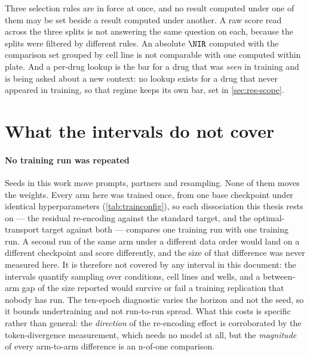%
\begin{scopelimit}
Three selection rules are in force at once, and no result computed under one of
them may be set beside a result computed under another. A raw score read across
the three splits is not answering the same question on each, because the splits
were filtered by different rules. An absolute $\NIR$ computed with the
comparison set grouped by cell line is not comparable with one computed within
plate. And a per-drug lookup is the bar for a drug that was \emph{seen} in
training and is being asked about a new context: no lookup exists for a drug
that never appeared in training, so that regime keeps its own bar, set in
\cref{sec:res-scope}.
\end{scopelimit}

\section{What the intervals do not cover}
\label{sec:lim-intervals}

\paragraph{No training run was repeated} Seeds in this work move prompts,
partners and resampling. None of them moves the weights. Every arm here was
trained once, from one base checkpoint under identical hyperparameters
(\cref{tab:trainconfig}), so each dissociation this thesis rests on --- the
residual re-encoding against the standard target, and the optimal-transport
target against both --- compares one training run with one training run. A
second run of the same arm under a different data order would land on a
different checkpoint and score differently, and the size of that difference was
never measured here. It is therefore not covered by any interval in this
document: the intervals quantify sampling over conditions, cell lines and wells,
and a between-arm gap of the size reported would survive or fail a training
replication that nobody has run. The ten-epoch diagnostic varies the horizon and
not the seed, so it bounds undertraining and not run-to-run spread. What this
costs is specific rather than general: the \emph{direction} of the re-encoding
effect is corroborated by the token-divergence measurement, which needs no
model at all, but the \emph{magnitude} of every arm-to-arm difference is an
n-of-one comparison.

